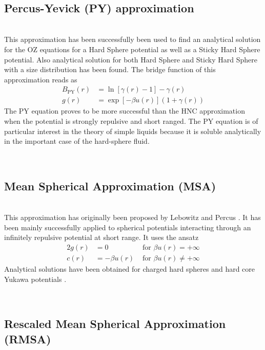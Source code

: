 \vphantom{.}~\\
\subsection{Percus-Yevick (PY) approximation}
~\\

This approximation has been successfully been used to find an analytical solution for
the OZ equations for a Hard Sphere potential as well as a Sticky Hard Sphere potential.
Also analytical solution for both Hard Sphere \cite{Percus1958,Wertheim1963} and
Sticky Hard Sphere  \cite{Baxter1968} with a size distribution has been found.
The bridge function of this approximation reads as
\begin{align} \label{eq:ozBHNC}
B_\text{PY}(r) &=\ln\left[\gamma(r)-1\right]-\gamma(r) \\
g(r)&= \exp\left[ -\beta u(r)\right]\left(1 +\gamma(r)\right)
\end{align}
The PY equation proves to be more successful than the HNC
approximation when the potential is strongly repulsive and short
ranged. The PY equation is of particular interest in the theory of
simple liquids because it is soluble analytically in the important
case of the hard-sphere fluid.

\vphantom{.}~\\
\subsection{Mean Spherical Approximation (MSA)}
\label{sec:MSA}~\\

This approximation has originally been proposed by Lebowitz and Percus \cite{Lebowitz1966}.
It has been mainly successfully applied to spherical potentials interacting through an infinitely
repulsive potential at short range. It uses the ansatz
\begin{alignat}{2}
g(r) &=  0 &\mbox{ for } \beta u(r) = +\infty \\
c(r) &= -\beta u(r) &\mbox{ for } \beta u(r) \neq +\infty
\end{alignat}
Analytical solutions have been obtained for charged hard spheres and hard core Yukawa potentials \cite{Caccamo1996}.

\vphantom{.}~\\
\subsection{Rescaled Mean Spherical Approximation (RMSA)}
\label{sec:RMSA}~\\

